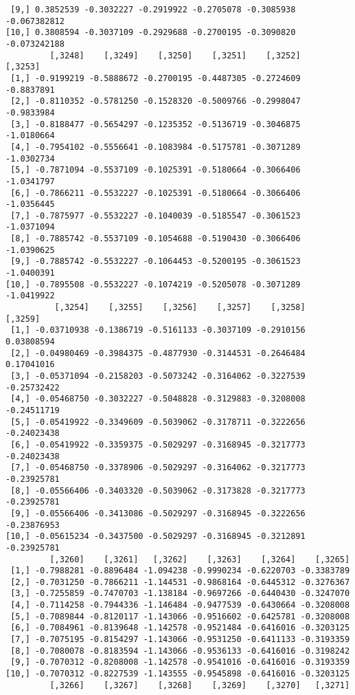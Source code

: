 \documentclass[
  letterpaper,
  DIV=11,
  numbers=noendperiod]{scrreprt}
\begin{document}
\begin{verbatim}
 [9,] 0.3852539 -0.3032227 -0.2919922 -0.2705078 -0.3085938 -0.067382812
[10,] 0.3808594 -0.3037109 -0.2929688 -0.2700195 -0.3090820 -0.073242188
         [,3248]    [,3249]    [,3250]    [,3251]    [,3252]    [,3253]
 [1,] -0.9199219 -0.5888672 -0.2700195 -0.4487305 -0.2724609 -0.8837891
 [2,] -0.8110352 -0.5781250 -0.1528320 -0.5009766 -0.2998047 -0.9833984
 [3,] -0.8188477 -0.5654297 -0.1235352 -0.5136719 -0.3046875 -1.0180664
 [4,] -0.7954102 -0.5556641 -0.1083984 -0.5175781 -0.3071289 -1.0302734
 [5,] -0.7871094 -0.5537109 -0.1025391 -0.5180664 -0.3066406 -1.0341797
 [6,] -0.7866211 -0.5532227 -0.1025391 -0.5180664 -0.3066406 -1.0356445
 [7,] -0.7875977 -0.5532227 -0.1040039 -0.5185547 -0.3061523 -1.0371094
 [8,] -0.7885742 -0.5537109 -0.1054688 -0.5190430 -0.3066406 -1.0390625
 [9,] -0.7885742 -0.5532227 -0.1064453 -0.5200195 -0.3061523 -1.0400391
[10,] -0.7895508 -0.5532227 -0.1074219 -0.5205078 -0.3071289 -1.0419922
          [,3254]    [,3255]    [,3256]    [,3257]    [,3258]     [,3259]
 [1,] -0.03710938 -0.1386719 -0.5161133 -0.3037109 -0.2910156  0.03808594
 [2,] -0.04980469 -0.3984375 -0.4877930 -0.3144531 -0.2646484  0.17041016
 [3,] -0.05371094 -0.2158203 -0.5073242 -0.3164062 -0.3227539 -0.25732422
 [4,] -0.05468750 -0.3032227 -0.5048828 -0.3129883 -0.3208008 -0.24511719
 [5,] -0.05419922 -0.3349609 -0.5039062 -0.3178711 -0.3222656 -0.24023438
 [6,] -0.05419922 -0.3359375 -0.5029297 -0.3168945 -0.3217773 -0.24023438
 [7,] -0.05468750 -0.3378906 -0.5029297 -0.3164062 -0.3217773 -0.23925781
 [8,] -0.05566406 -0.3403320 -0.5039062 -0.3173828 -0.3217773 -0.23925781
 [9,] -0.05566406 -0.3413086 -0.5029297 -0.3168945 -0.3222656 -0.23876953
[10,] -0.05615234 -0.3437500 -0.5029297 -0.3168945 -0.3212891 -0.23925781
         [,3260]    [,3261]   [,3262]    [,3263]    [,3264]    [,3265]
 [1,] -0.7988281 -0.8896484 -1.094238 -0.9990234 -0.6220703 -0.3383789
 [2,] -0.7031250 -0.7866211 -1.144531 -0.9868164 -0.6445312 -0.3276367
 [3,] -0.7255859 -0.7470703 -1.138184 -0.9697266 -0.6440430 -0.3247070
 [4,] -0.7114258 -0.7944336 -1.146484 -0.9477539 -0.6430664 -0.3208008
 [5,] -0.7089844 -0.8120117 -1.143066 -0.9516602 -0.6425781 -0.3208008
 [6,] -0.7084961 -0.8139648 -1.142578 -0.9521484 -0.6416016 -0.3203125
 [7,] -0.7075195 -0.8154297 -1.143066 -0.9531250 -0.6411133 -0.3193359
 [8,] -0.7080078 -0.8183594 -1.143066 -0.9536133 -0.6416016 -0.3198242
 [9,] -0.7070312 -0.8208008 -1.142578 -0.9541016 -0.6416016 -0.3193359
[10,] -0.7070312 -0.8227539 -1.143555 -0.9545898 -0.6416016 -0.3203125
         [,3266]    [,3267]    [,3268]    [,3269]    [,3270]   [,3271]

\end{verbatim}
\end{document}

